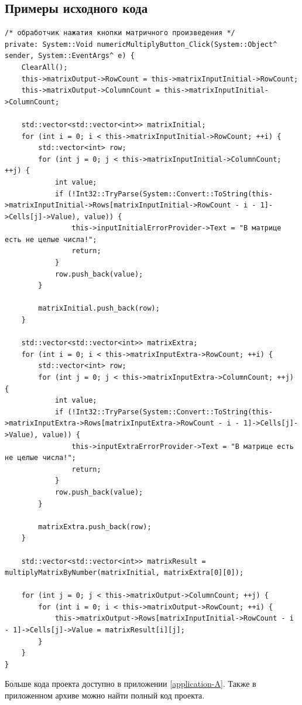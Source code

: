 \subsection{Примеры исходного кода}
\begin{verbatim}
/* обработчик нажатия кнопки матричного произведения */
private: System::Void numericMultiplyButton_Click(System::Object^ sender, System::EventArgs^ e) {
    ClearAll();
    this->matrixOutput->RowCount = this->matrixInputInitial->RowCount;
    this->matrixOutput->ColumnCount = this->matrixInputInitial->ColumnCount;
    
    std::vector<std::vector<int>> matrixInitial;
    for (int i = 0; i < this->matrixInputInitial->RowCount; ++i) {
        std::vector<int> row;
        for (int j = 0; j < this->matrixInputInitial->ColumnCount; ++j) {
            int value;
            if (!Int32::TryParse(System::Convert::ToString(this->matrixInputInitial->Rows[matrixInputInitial->RowCount - i - 1]->Cells[j]->Value), value)) {
                this->inputInitialErrorProvider->Text = "В матрице есть не целые числа!";
                return;
            }
            row.push_back(value);
        }
    
        matrixInitial.push_back(row);
    }
    
    std::vector<std::vector<int>> matrixExtra;
    for (int i = 0; i < this->matrixInputExtra->RowCount; ++i) {
        std::vector<int> row;
        for (int j = 0; j < this->matrixInputExtra->ColumnCount; ++j) {
            int value;
            if (!Int32::TryParse(System::Convert::ToString(this->matrixInputExtra->Rows[matrixInputExtra->RowCount - i - 1]->Cells[j]->Value), value)) {
                this->inputExtraErrorProvider->Text = "В матрице есть не целые числа!";
                return;
            }
            row.push_back(value);
        }
    
        matrixExtra.push_back(row);
    }
    
    std::vector<std::vector<int>> matrixResult = multiplyMatrixByNumber(matrixInitial, matrixExtra[0][0]);
    
    for (int j = 0; j < this->matrixOutput->ColumnCount; ++j) {
        for (int i = 0; i < this->matrixOutput->RowCount; ++i) {
            this->matrixOutput->Rows[matrixInputInitial->RowCount - i - 1]->Cells[j]->Value = matrixResult[i][j];
        }
    }
}
\end{verbatim}

Больше кода проекта доступно в приложении \ref{application-A}. Также в приложенном архиве можно найти полный код проекта.